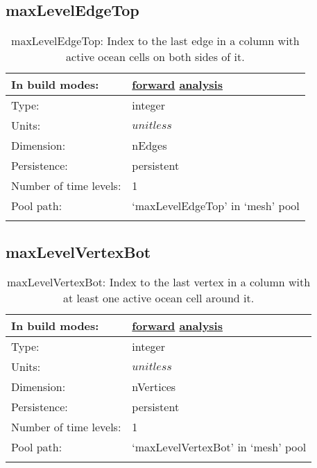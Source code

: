 \subsection[maxLevelEdgeTop]{maxLevelEdgeTop}
\label{subsec:var_sec_mesh_maxLevelEdgeTop}
\begin{center}
\begin{longtable}{| p{2.0in} | p{4.0in} |}
        \hline 
        In build modes: & \hyperref[subsec:forward_var_tab_mesh]{forward} \hyperref[subsec:analysis_var_tab_mesh]{analysis} \\
        \hline 
        Type: & integer \\
        \hline 
        Units: & $unitless$ \\
        \hline 
        Dimension: & nEdges \\
        \hline 
        Persistence: & persistent \\
        \hline 
        Number of time levels: & 1 \\
        \hline 
            Pool path: & `maxLevelEdgeTop' in `mesh' pool \\
		 \hline 
    \caption{maxLevelEdgeTop: Index to the last edge in a column with active ocean cells on both sides of it.}
\end{longtable}
\end{center}
\subsection[maxLevelVertexBot]{maxLevelVertexBot}
\label{subsec:var_sec_mesh_maxLevelVertexBot}
\begin{center}
\begin{longtable}{| p{2.0in} | p{4.0in} |}
        \hline 
        In build modes: & \hyperref[subsec:forward_var_tab_mesh]{forward} \hyperref[subsec:analysis_var_tab_mesh]{analysis} \\
        \hline 
        Type: & integer \\
        \hline 
        Units: & $unitless$ \\
        \hline 
        Dimension: & nVertices \\
        \hline 
        Persistence: & persistent \\
        \hline 
        Number of time levels: & 1 \\
        \hline 
            Pool path: & `maxLevelVertexBot' in `mesh' pool \\
		 \hline 
    \caption{maxLevelVertexBot: Index to the last vertex in a column with at least one active ocean cell around it.}
\end{longtable}
\end{center}

